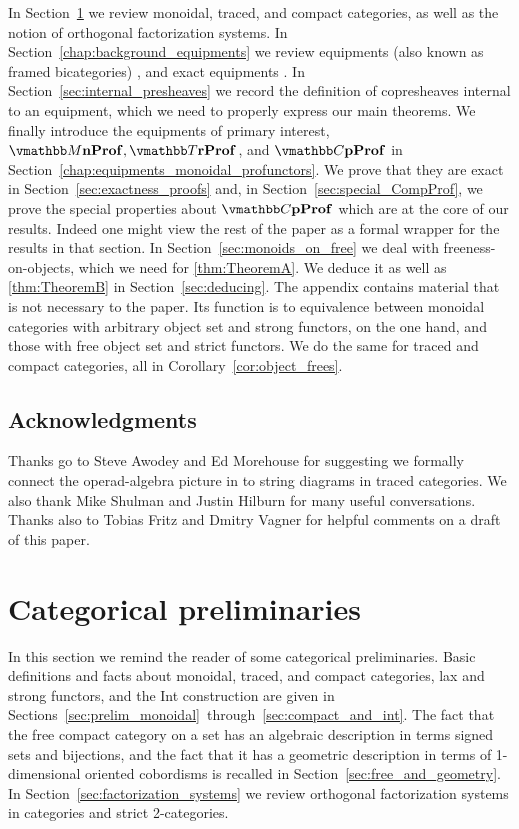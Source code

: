 \documentclass[11pt,oneside,article]{memoir}
\begin{document}
In Section~\ref{chap:traced_categories} we review monoidal, traced, and compact categories, as well
as the notion of orthogonal factorization systems. In Section~\ref{chap:background_equipments} we
review equipments (also known as framed bicategories) \cite{Shulman}, and exact equipments
\cite{Schultz2015}. In Section~\ref{sec:internal_presheaves} we record the definition of
copresheaves internal to an equipment, which we need to properly express our main theorems. We
finally introduce the equipments of primary interest, $\dMonProf, \dTrProf$, and $\dCompProf$ in
Section~\ref{chap:equipments_monoidal_profunctors}. We prove that they are exact in
Section~\ref{sec:exactness_proofs} and, in Section~\ref{sec:special_CompProf}, we prove the special
properties about $\dCompProf$ which are at the core of our results. Indeed one might view the rest
of the paper as a formal wrapper for the results in that section. In
Section~\ref{sec:monoids_on_free} we deal with freeness-on-objects, which we need for
\ref{thm:TheoremA}. We deduce it as well as \ref{thm:TheoremB} in Section~\ref{sec:deducing}. The appendix contains material that is not necessary to the paper. Its function is to equivalence between monoidal categories with arbitrary object set and strong functors, on the one hand, and those with free object set and strict functors. We do the same for traced and compact categories, all in Corollary~\ref{cor:object_frees}.

\section*{Acknowledgments}

Thanks go to Steve Awodey and Ed Morehouse for suggesting we formally connect the operad-algebra
picture in \cite{RupelSpivak} to string diagrams in traced categories. We also thank Mike Shulman
and Justin Hilburn for many useful conversations. Thanks also to Tobias Fritz and Dmitry Vagner for helpful comments on a draft of this paper.

\chapter{Categorical preliminaries}\label{chap:traced_categories}

In this section we remind the reader of some categorical preliminaries. Basic definitions and facts
about monoidal, traced, and compact categories, lax and strong functors, and the Int construction
are given in Sections~\ref{sec:prelim_monoidal}~through~\ref{sec:compact_and_int}. The fact that the
free compact category on a set has an algebraic description in terms signed sets and bijections, and
the fact that it has a geometric description in terms of 1-dimensional oriented cobordisms is
recalled in Section~\ref{sec:free_and_geometry}. In Section~\ref{sec:factorization_systems} we review orthogonal factorization systems in categories and strict 2-categories.
\end{document}

